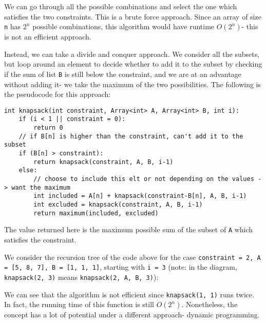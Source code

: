 \documentclass[a4paper, openany]{memoir}
\begin{document}
\noindent We can go through all the possible combinations and select the one which satisfies the two constraints. This is a brute force approach. Since an array of size \texttt{n} has $2^n$ possible combinations, this algorithm would have runtime $O(2^n)$- this is not an efficient approach.

\noindent Instead, we can take a divide and conquer approach. We consider all the subsets, but loop around an element to decide whether to add it to the subset by checking if the sum of list \texttt{B} is still below the constraint, and we are at an advantage without adding it- we take the maximum of the two possibilities. The following is the pseudocode for this approach:
\begin{lstlisting}[language=pseudocode]
int knapsack(int constraint, Array<int> A, Array<int> B, int i):
    if (i < 1 || constraint = 0):
        return 0
    // if B[n] is higher than the constraint, can't add it to the subset
    if (B[n] > constraint):
        return knapsack(constraint, A, B, i-1)
    else:
        // choose to include this elt or not depending on the values -> want the maximum
        int included = A[n] + knapsack(constraint-B[n], A, B, i-1)
        int excluded = knapsack(constraint, A, B, i-1)
        return maximum(included, excluded)
\end{lstlisting}
The value returned here is the maximum possible sum of the subset of \texttt{A} which satisfies the constraint.

\noindent We consider the recursion tree of the code above for the case \texttt{constraint = 2, A = [5, 8, 7], B = [1, 1, 1]}, starting with \texttt{i = 3} (note: in the diagram, \texttt{knapsack(2, 3)} means \texttt{knapsack(2, A, B, 3)}):
\begin{center}
\end{center}
We can see that the algorithm is not efficient since \texttt{knapsack(1, 1)} runs twice. In fact, the running time of this function is still $O(2^n)$. Nonetheless, the concept has a lot of potential under a different approach- dynamic programming.
\end{document}
